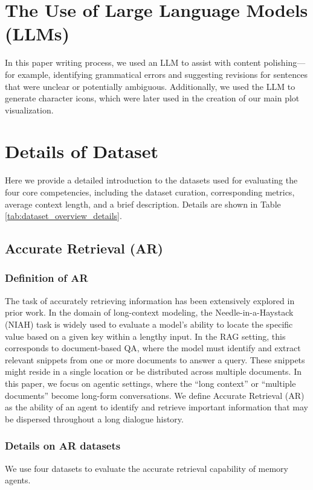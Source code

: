\newpage
\appendix

\section{The Use of Large Language Models (LLMs)}

In this paper writing process, we used an LLM to assist with content polishing—for example, identifying grammatical errors and suggesting revisions for sentences that were unclear or potentially ambiguous. Additionally, we used the LLM to generate character icons, which were later used in the creation of our main plot visualization.

\section{Details of Dataset}
\label{sec:details_of_datasets}

Here we provide a detailed introduction to the datasets used for evaluating the four core competencies, including the dataset curation, corresponding metrics, average context length, and a brief description. Details are shown in Table \ref{tab:dataset_overview_details}.

\subsection{Accurate Retrieval (AR)}

\subsubsection{Definition of AR}
The task of accurately retrieving information has been extensively explored in prior work. In the domain of long-context modeling, the Needle-in-a-Haystack (NIAH) task is widely used to evaluate a model’s ability to locate the specific value based on a given key within a lengthy input. In the RAG setting, this corresponds to document-based QA, where the model must identify and extract relevant snippets from one or more documents to answer a query. These snippets might reside in a single location or be distributed across multiple documents.
In this paper, we focus on agentic settings, where the “long context” or “multiple documents” become long-form conversations. We define Accurate Retrieval (AR) as the ability of an agent to identify and retrieve important information that may be dispersed throughout a long dialogue history. 

\subsubsection{Details on AR datasets}
We use four datasets to evaluate the accurate retrieval capability of memory agents. 
